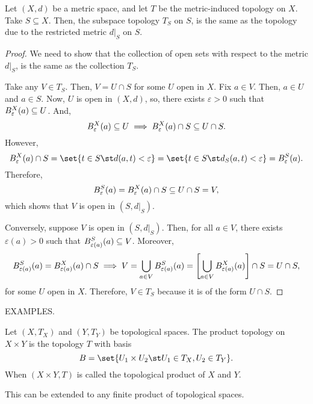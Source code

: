 \begin{nthm}
  Let $(X,d)$ be a metric space, and let $T$ be the metric-induced topology on $X$. Take $S \subseteq X$. Then, the subspace topology $T_S$ on $S$, is the same as the topology due to the restricted metric $d|_S$ on $S$.
\end{nthm}
\begin{proof}
  We need to show that the collection of open sets with respect to the metric $d|_S$, is the same as the collection $T_S$.

  Take any $V \in T_S$. Then, $V = U \cap S$ for some $U$ open in $X$. Fix $a \in V$. Then, $a \in U$ and $a \in S$. Now, $U$ is open in $(X,d)$, so, there exists $\varepsilon > 0$ such that $B_{\varepsilon}^{X}(a) \subseteq U$. And,
  \begin{equation*}
    B_{\varepsilon}^{X}(a) \subseteq U
    \implies
    B_{\varepsilon}^{X}(a) \cap S \subseteq U \cap S.
  \end{equation*}
  However,
  \begin{equation*}
    \oB_{\varepsilon}^{X}(a) \cap S
    = \set{t \in S \st d(a,t)<\varepsilon}
    = \set{t \in S \st d_{S}(a,t)<\varepsilon}
    = \oB_{\varepsilon}^{S}(a).
  \end{equation*}
  Therefore,
  \begin{equation*}
    B_{\varepsilon}^{S}(a) = B_{\varepsilon}^{X}(a) \cap S \subseteq U \cap S = V,
  \end{equation*}
  which shows that $V$ is open in $(S, d|_S)$.

  Conversely, suppose $V$ is open in $(S, d|_S)$. Then, for all $a \in V$, there exists $\varepsilon(a) > 0$ such that $B_{\varepsilon(a)}^{S}(a) \subseteq V$. Moreover,
  \begin{equation*}
    B_{\varepsilon(a)}^{S}(a) = B_{\varepsilon(a)}^{X}(a) \cap S \implies
    V = \bigcup_{a \in V} B_{\varepsilon(a)}^{S}(a)
    = \left[\bigcup_{a \in V} B_{\varepsilon(a)}^{X}(a)\right] \cap S = U \cap S,
  \end{equation*}
  for some $U$ open in $X$. Therefore, $V \in T_S$ because it is of the form $U \cap S$.
\end{proof}

EXAMPLES.

\begin{ndfn}
  Let $(X,T_X)$ and $(Y,T_Y)$ be topological spaces. The product topology on $X \times Y$ is the topology $T$ with basis
  \begin{equation*}
    B = \set{U_1 \times U_2 \st U_1 \in T_X, U_2 \in T_Y}.
  \end{equation*}
  When $(X \times Y, T)$ is called the topological product of $X$ and $Y$.
\end{ndfn}
This can be extended to any finite product of topological spaces.

